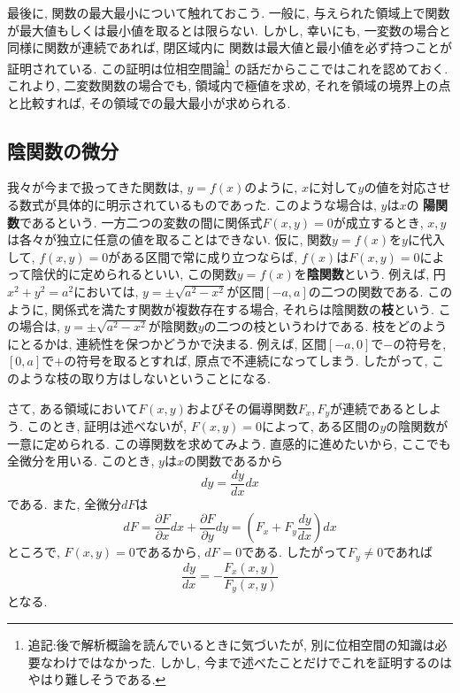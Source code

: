         最後に, 関数の最大最小について触れておこう. 一般に, 与えられた領域上で関数が最大値もしくは最小値を取るとは限らない. しかし, 幸いにも, 一変数の場合と同様に関数が連続であれば, 閉区域内に
        関数は最大値と最小値を必ず持つことが証明されている. この証明は位相空間論\footnote{追記:後で解析概論を読んでいるときに気づいたが, 別に位相空間の知識は必要なわけではなかった. しかし, 今まで述べたことだけでこれを証明するのはやはり難しそうである.}
        の話だからここではこれを認めておく.
        これより, 二変数関数の場合でも, 領域内で極値を求め, それを領域の境界上の点と比較すれば, その領域での最大最小が求められる.
    \clearpage
    \subsection{陰関数の微分}
        我々が今まで扱ってきた関数は, $y=f(x)$のように, $x$に対して$y$の値を対応させる数式が具体的に明示されているものであった. このような場合は, $y$は$x$の
        \textbf{陽関数}であるという. 一方二つの変数の間に関係式$F(x,y)=0$が成立するとき, $x,y$は各々が独立に任意の値を取ることはできない.
        仮に, 関数$y=f(x)$を$y$に代入して, $f(x,y)=0$がある区間で常に成り立つならば, $f(x)$は$F(x,y)=0$によって陰伏的に定められるといい, この関数$y=f(x)$を\textbf{陰関数}という.
        例えば, 円$x^2+y^2=a^2$においては, $y=\pm\sqrt{a^2-x^2}$が区間$[-a,a]$の二つの関数である. このように, 関係式を満たす関数が複数存在する場合, それらは陰関数の\textbf{枝}という.
        この場合は, $y=\pm\sqrt{a^2-x^2}$が陰関数$y$の二つの枝というわけである. 枝をどのようにとるかは, 連続性を保つかどうかで決まる. 例えば, 区間$[-a,0]$で$-$の符号を, $[0,a]$で$+$の符号を取るとすれば, 
        原点で不連続になってしまう. したがって, このような枝の取り方はしないということになる.

        さて, ある領域において$F(x,y)$およびその偏導関数$F_x,F_y$が連続であるとしよう. このとき, 証明は述べないが, $F(x,y)=0$によって, ある区間の$y$の陰関数が一意に定められる.
        この導関数を求めてみよう. 直感的に進めたいから, ここでも全微分を用いる. このとき, $y$は$x$の関数であるから
        \begin{equation*}
            dy=\frac{dy}{dx}dx
        \end{equation*}
        である. また, 全微分$dF$は
        \begin{equation*}
            dF=\frac{\partial F}{\partial x}dx+\frac{\partial F}{\partial y}dy =\left(F_x+F_y\frac{dy}{dx}\right)dx
        \end{equation*}
        ところで, $F(x,y)=0$であるから, $dF=0$である. したがって$F_y\neq 0$であれば
        \begin{equation}
            \frac{dy}{dx}=-\frac{F_x(x,y)}{F_y(x,y)} \label{eq:偏微分:陰関数の微分F(x,y)}
        \end{equation}
        となる.

